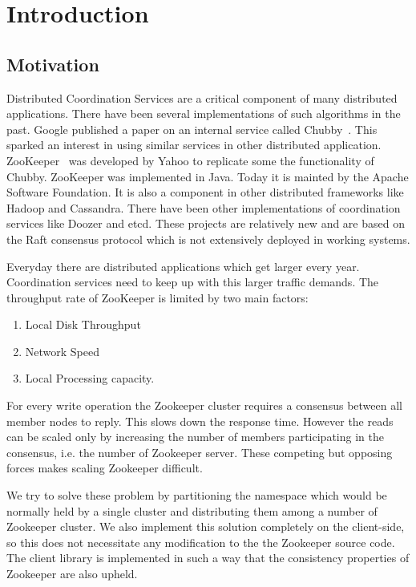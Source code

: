 \chapter{Introduction}

\section{Motivation}

Distributed Coordination Services are a critical component of many distributed applications. There have been several implementations of such algorithms in the past. Google published a paper on an internal service called Chubby~\cite{burrows2006chubby}. This sparked an interest in using similar services in other distributed application. ZooKeeper~\cite{hunt2010zookeeper} was developed by Yahoo to replicate some the functionality of Chubby. ZooKeeper was implemented in Java. Today it is mainted by the Apache Software Foundation. It is also a component in other distributed frameworks like Hadoop and Cassandra. There have been other implementations of coordination services like Doozer and etcd. These projects are relatively new and are based on the Raft consensus protocol which is not extensively deployed in working systems. 

Everyday there are distributed applications which get larger every year. Coordination services need to keep up with this larger traffic demands. The throughput rate of ZooKeeper is limited by two main factors:
\begin{enumerate}
  \item Local Disk Throughput
  \item Network Speed
  \item Local Processing capacity.
\end{enumerate}

For every write operation the Zookeeper cluster requires a consensus between all member nodes to reply. This slows down the response time. However the reads can be scaled only by increasing the number of members participating in the consensus, i.e. the number of Zookeeper server. These competing but opposing forces makes scaling Zookeeper difficult. 

We try to solve these problem by partitioning the namespace which would be normally held by a single cluster and distributing them among a number of Zookeeper cluster. We also implement this solution completely on the client-side, so this does not necessitate any modification to the the Zookeeper source code. The client library is implemented in such a way that the consistency properties of Zookeeper are also upheld.

